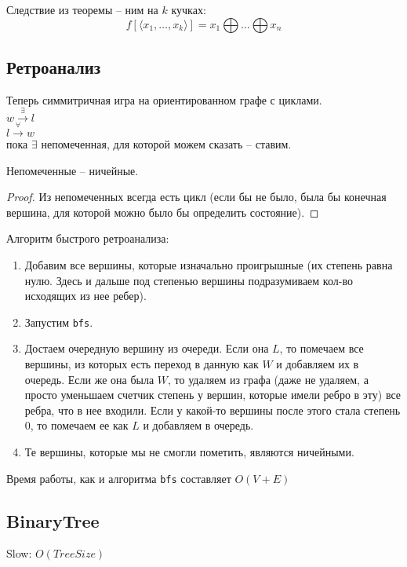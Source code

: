 Следствие из теоремы -- ним на $k$ кучках:
$$f[\langle x_1, \dots, x_k \rangle] = x_1 \bigoplus \dots \bigoplus x_n$$

\subsection{Ретроанализ}
Теперь симмитричная игра на ориентированном графе с циклами.\\
$w \overset{\exists}{\rightarrow} l$\\
$l \overset{\forall}{\rightarrow} w$\\

пока $\exists$ непомеченная, для которой можем сказать -- ставим.

\begin{lemma}
Непомеченные -- ничейные.
\end{lemma}

\begin{proof}
Из непомеченных всегда есть цикл (если бы не было, была бы конечная вершина, для которой можно было бы определить состояние).
\end{proof}

Алгоритм быстрого ретроанализа:\\
\begin{enumerate}
\item Добавим все вершины, которые изначально проигрышные (их степень равна нулю. Здесь и дальше под степенью вершины подразумиваем
кол-во исходящих из нее ребер).
\item Запустим \texttt{bfs}.
\item Достаем очередную вершину из очереди. Если она $L$, то помечаем все вершины, из которых есть переход в данную как $W$ и добавляем
их в очередь. Если же она была $W$, то удаляем из графа (даже не удаляем, а просто уменьшаем счетчик степень у вершин, которые имели 
ребро в эту) все ребра, что в нее входили. Если у какой-то вершины после этого стала степень 0, то помечаем ее как $L$ и добавляем в очередь.
\item Те вершины, которые мы не смогли пометить, являются ничейными.
\end{enumerate}
Время работы, как и алгоритма \texttt{bfs} составляет $O(V + E)$\\

\subsection{BinaryTree}
Slow: $O(TreeSize)$\\

